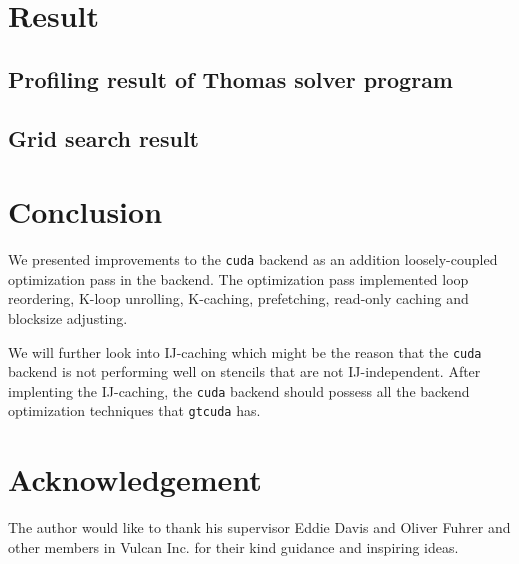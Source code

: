 \documentclass[]{article}
\begin{document}
\section{Result}
\subsection{Profiling result of Thomas solver program}

 
\subsection{Grid search result}



\section{Conclusion}
We presented improvements to the \texttt{cuda} backend as an addition loosely-coupled optimization pass in the backend. The optimization pass implemented loop reordering, K-loop unrolling, K-caching, prefetching, read-only caching and blocksize adjusting.

We will further look into IJ-caching which might be the reason that the \texttt{cuda} backend is not performing well on stencils that are not IJ-independent. After implenting the IJ-caching, the \texttt{cuda} backend should possess all the backend optimization techniques that \texttt{gtcuda} has.

\section*{Acknowledgement}
The author would like to thank his supervisor Eddie Davis and Oliver Fuhrer and other members in Vulcan Inc. for their kind guidance and inspiring ideas.

\newpage


\end{document}
